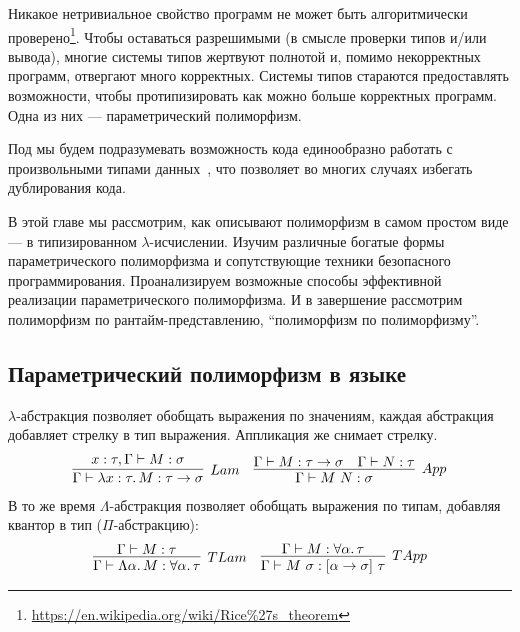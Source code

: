 
Никакое нетривиальное свойство программ не может быть алгоритмически проверено\footnote{\url{https://en.wikipedia.org/wiki/Rice\%27s_theorem}}.
Чтобы оставаться разрешимыми (в смысле проверки типов и/или вывода), многие системы типов жертвуют полнотой и, помимо некорректных программ, отвергают много корректных.
Системы типов стараются предоставлять возможности, чтобы протипизировать как можно больше корректных программ.
Одна из них --- параметрический полиморфизм.

Под  мы будем подразумевать возможность кода единообразно работать с произвольными типами данных~\cite{strachey2000fundamental, cardelli1985understanding}, что позволяет во многих случаях избегать дублирования кода.

В этой главе мы рассмотрим, как описывают полиморфизм в самом простом виде --- в типизированном $\lambda$-исчислении.
Изучим различные богатые формы параметрического полиморфизма и сопутствующие техники безопасного программирования.
Проанализируем возможные способы эффективной реализации параметрического полиморфизма.
И в завершение рассмотрим полиморфизм по рантайм-представлению, ``полиморфизм по полиморфизму''.

\subsection{Параметрический полиморфизм в языке} \label{subsec:lang-parametric-polumorphism}

$\lambda$-абстракция позволяет обобщать выражения по значениям, каждая абстракция добавляет стрелку в тип выражения.
Аппликация же снимает стрелку.
\[
    \begin{array}{cc}
        \infer[Lam]{\Gamma\vdash \lambda x : \tau\ldotp M : \tau\to\sigma}{x : \tau, \Gamma\vdash M : \sigma}
        &
        \infer[App]{\Gamma\vdash M\ap N : \sigma}{\Gamma\vdash M : \tau\to\sigma & \Gamma\vdash N : \tau}
    \end{array}
\]
В то же время $\Lambda$-абстракция позволяет обобщать выражения по типам, добавляя квантор в тип ($\Pi$-абстракцию):
\[
    \begin{array}{cc}
        \infer[TLam]{\Gamma\vdash\Lambda\alpha\ldotp M : \forall\alpha\ldotp\tau}{\Gamma\vdash M : \tau}
        &
        \infer[TApp]{\Gamma\vdash M\ap\sigma : [\alpha\to\sigma]\ap\tau}{\Gamma\vdash M : \forall\alpha\ldotp\tau}
    \end{array}
\]

